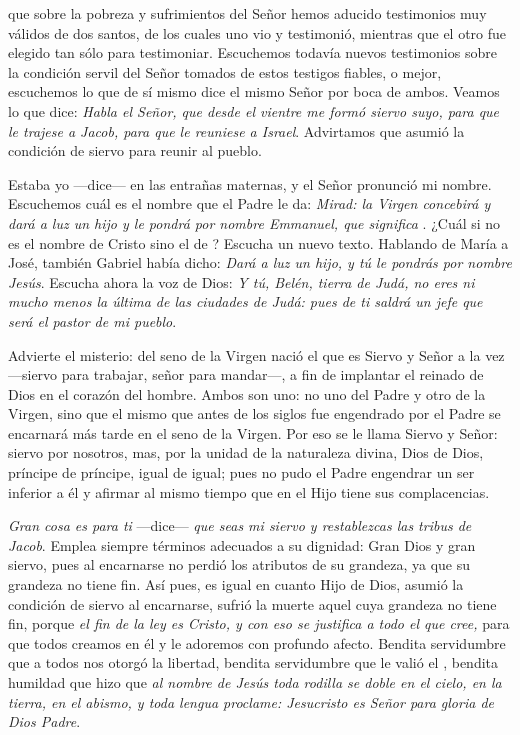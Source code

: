 \begin{body}
	 que sobre la pobreza y sufrimientos del Señor hemos aducido testimonios muy válidos de dos santos, de los cuales uno vio y testimonió, mientras que el otro fue elegido tan sólo para testimoniar. Escuchemos todavía nuevos testimonios sobre la condición servil del Señor tomados de estos testigos fiables, o mejor, escuchemos lo que de sí mismo dice el mismo Señor por boca de ambos. Veamos lo que dice: \emph{Habla el Señor, que desde el vientre me formó siervo suyo, para que le trajese a Jacob, para que le reuniese a Israel}. Advirtamos que asumió la condición de siervo para reunir al pueblo.
	
	Estaba yo ---dice--- en las entrañas maternas, y el Señor pronunció mi nombre. Escuchemos cuál es el nombre que el Padre le da: \emph{Mirad: la Virgen concebirá y dará a luz un hijo y le pondrá por nombre Emmanuel, que significa }. ¿Cuál si no es el nombre de Cristo sino el de ? Escucha un nuevo texto. Hablando de María a José, también Gabriel había dicho: \emph{Dará a luz un hijo, y tú le pondrás por nombre Jesús}. Escucha ahora la voz de Dios: \emph{Y tú, Belén, tierra de Judá, no eres ni mucho menos la última de las ciudades de Judá: pues de ti saldrá un jefe que será el pastor de mi pueblo}.
	
	Advierte el misterio: del seno de la Virgen nació el que es Siervo y Señor a la vez ---siervo para trabajar, señor para mandar---, a fin de implantar el reinado de Dios en el corazón del hombre. Ambos son uno: no uno del Padre y otro de la Virgen, sino que el mismo que antes de los siglos fue engendrado por el Padre se encarnará más tarde en el seno de la Virgen. Por eso se le llama Siervo y Señor: siervo por nosotros, mas, por la unidad de la naturaleza divina, Dios de Dios, príncipe de príncipe, igual de igual; pues no pudo el Padre engendrar un ser inferior a él y afirmar al mismo tiempo que en el Hijo tiene sus complacencias.
	
	\emph{Gran cosa es para ti} ---dice--- \emph{que seas mi siervo y restablezcas las tribus de Jacob}. Emplea siempre términos adecuados a su dignidad: Gran Dios y gran siervo, pues al encarnarse no perdió los atributos de su grandeza, ya que su grandeza no tiene fin. Así pues, es igual en cuanto Hijo de Dios, asumió la condición de siervo al encarnarse, sufrió la muerte aquel cuya grandeza no tiene fin, porque \emph{el fin de la ley es Cristo, y con eso se justifica a todo el que cree,} para que todos creamos en él y le adoremos con profundo afecto. Bendita servidumbre que a todos nos otorgó la libertad, bendita servidumbre que le valió el , bendita humildad que hizo que \emph{al nombre de Jesús toda rodilla se doble en el cielo, en la tierra, en el abismo, y toda lengua proclame: Jesucristo es Señor para gloria de Dios Padre}.
\end{body}


